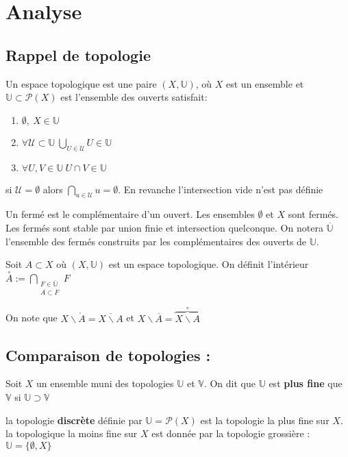 \section{Analyse}
\subsection{ Rappel de topologie }

\begin{definition}

Un espace topologique est une paire $(X, \mathbb{U})$, où $X$ est un ensemble et \\$\mathbb{U}\subset \mathcal{P}(X)$ est l'ensemble des ouverts satisfait:\\
        \begin{enumerate}
            \item $\emptyset, \ X\in \mathbb{U}$
            \item $\forall \mathcal{U}\subset \mathbb{U}\ \bigcup_{U\in \mathcal{U}} U\in \mathbb{U}$
            \item $\forall U,V\in \mathbb{U}\ U \cap V \in \mathbb{U}$
            \end{enumerate}
\end{definition}            
            
\begin{remarque}
si $\mathcal{U}=\emptyset $ alors $\bigcap\limits_{u\in \mathcal{U}} u = \emptyset $. En revanche l'intersection vide n'est pas définie
\end{remarque}
\begin{remarque}
Un fermé est le complémentaire d'un ouvert. Les ensembles $\emptyset$ et $X$ sont fermés. Les fermés sont stable par union finie et intersection quelconque. On notera $\overline{\mathbb{U}}$ l'ensemble des fermés construits par les complémentaires des ouverts de $\mathbb{U}$.
\end{remarque}

\begin{definition}
Soit $A\subset X$ où $(X,\mathbb{U})$ est un espace topologique. On définit l'intérieur $\overset{\circ}{A}:=\bigcap\limits_{\substack{F \in \overline{\mathbb{U}} \\ A\subset F}}F$
\end{definition}
On note que $X\backslash\mathring{A}=\overline{X\backslash A}$ et $X\backslash\overline{A} =\overbrace{X\backslash A}^{\circ}$

\subsection{Comparaison de topologies :}
\begin{definition}
    Soit $X$ un ensemble muni des topologies $\mathbb{U}$ et $\mathbb{V}$. On dit que $\mathbb{U}$ est \textbf{plus fine} que $\mathbb{V}$ si $\mathbb{U}\supset\mathbb{V}$
\end{definition}
\begin{ex}
    la topologie \textbf{discrète} définie par $\mathbb{U}=\mathcal{P}(X)$ est la topologie la plus fine sur $X$. la topologique la moins fine sur $X$ est donnée par la topologie grossière : $\mathbb{U}=\{\emptyset, X\}$
\end{ex}

